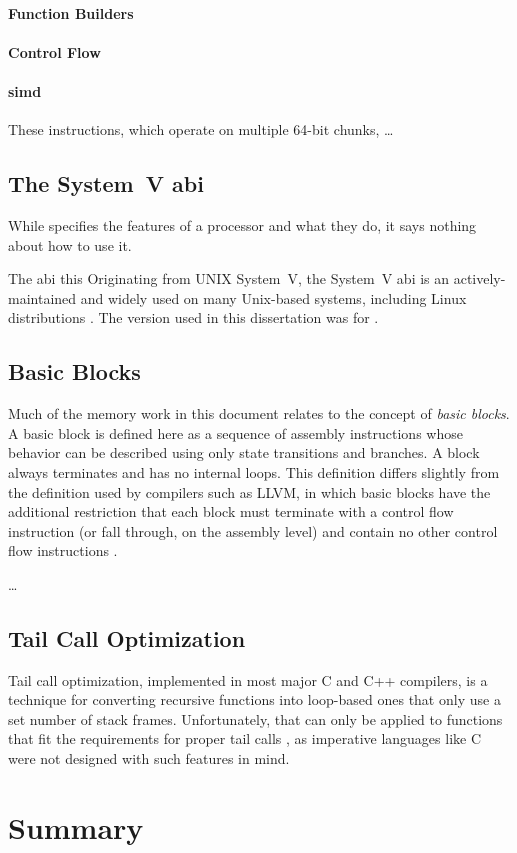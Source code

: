 \paragraph{Function Builders}

\paragraph{Control Flow}

\paragraph{\ac{simd}}
These instructions, which operate on multiple 64-bit chunks,
\todo\dots

\subsection{The System~V \acs*{abi}}
While  specifies the features of a processor and what they do,
it says nothing about how to use it.



The \ac{abi} this 
Originating from UNIX System~V, the System~V \ac{abi}
is an actively-maintained and widely used on many Unix-based systems,
including Linux distributions \autocite{systemv-ABI-git}.
The version used in this dissertation was for \arch.

\subsection{Basic Blocks}
Much of the memory work in this document relates to the concept of \emph{basic blocks}.%
A basic block is defined here as a sequence of assembly instructions
whose behavior can be described using only state transitions and branches.
A block always terminates and has no internal loops.
This definition differs slightly from the definition used by compilers such as LLVM,
in which basic blocks have the additional restriction that
each block must terminate with a control flow instruction
(or fall through, on the assembly level) and contain no other control flow instructions
\autocite{llvm:functions,llvm:terminators}.

\todo\dots

\subsection{Tail Call Optimization}
Tail call%
optimization, implemented in most major C and C++ compilers, is a technique
for converting recursive functions into loop-based ones that only use
a set number of stack frames.
Unfortunately, that can only be applied to functions that fit the requirements
for proper tail calls \autocite{probst2001proper},
as imperative languages like C were not designed with such features in mind.


\section{Summary}
